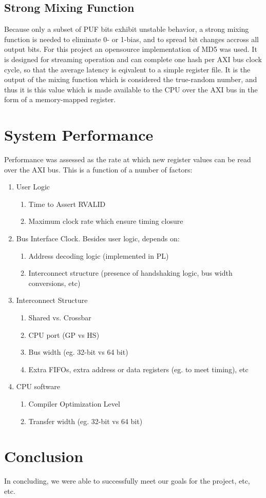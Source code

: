 \documentclass[journal]{IEEEtran}
\begin{document}
\subsection{Strong Mixing Function}

Because only a subset of PUF bits exhibit unstable behavior, a strong mixing function is needed to eliminate 0- or 1-bias, and to spread bit changes accross all output bits. For this project an opensource implementation of MD5 was used. It is designed for streaming operation and can complete one hash per AXI bus clock cycle, so that the average latency is eqivalent to a simple register file. It is the output of the mixing function which is considered the true-random number, and thus it is this value which is made available to the CPU over the AXI bus in the form of a memory-mapped register.  

\section{System Performance}

Performance was assessed as the rate at which new register values can be read over the AXI bus. This is a function of a number of factors:

\begin{enumerate}
  \item User Logic
  \begin{enumerate}
    \item Time to Assert RVALID
    \item Maximum clock rate which ensure timing closure
  \end{enumerate}
  \item Bus Interface Clock. Besides user logic, depends on: 
  \begin{enumerate}
    \item Address decoding logic (implemented in PL) 
   \item  Interconnect structure (presence of handshaking logic, bus width conversions, etc)
  \end{enumerate}
  \item Interconnect Structure 
 \begin{enumerate}
    \item Shared vs. Crossbar
    \item CPU port (GP vs HS)
    \item Bus width (eg. 32-bit vs 64 bit)
    \item Extra FIFOs, extra address or data registers (eg. to meet timing), etc
  \end{enumerate}
  \item CPU software
 \begin{enumerate}
    \item Compiler Optimization Level
    \item Transfer width (eg. 32-bit vs 64 bit) 
  \end{enumerate}
\end{enumerate}


\section{Conclusion}

In concluding, we were able to successfully meet our goals for the project, etc, etc.  






\end{document}
